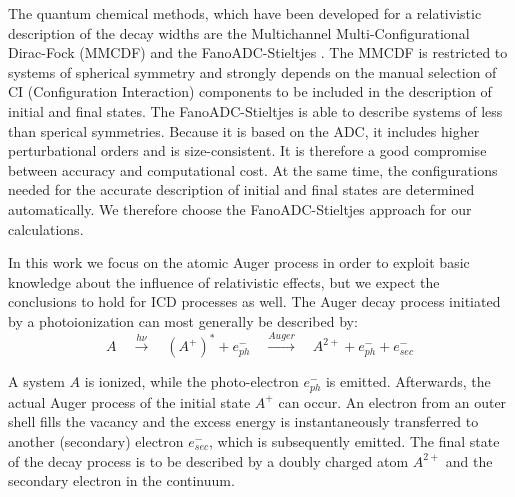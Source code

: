 The quantum chemical methods, which have been developed for a relativistic
description of the decay widths are the Multichannel Multi-Configurational
Dirac-Fock (MMCDF) \cite{Fritzsche11} and the FanoADC-Stieltjes \cite{Fasshauer15_1}.
The MMCDF is restricted to systems of spherical symmetry and strongly depends on
the manual selection of CI (Configuration
Interaction) components to be included in the description of initial and      
final states. The FanoADC-Stieltjes is able to describe systems of less than
sperical symmetries. Because it is based on the ADC, it includes higher perturbational
orders and is size-consistent. It is therefore a good compromise between
accuracy and computational cost. At the same time, the configurations needed for the
accurate description of initial and final states are determined automatically.
We therefore choose the FanoADC-Stieltjes approach for our calculations.


In this work we focus on the atomic Auger process     
in order                                      
to exploit basic knowledge about the influence of relativistic effects,
but we expect the conclusions to hold for ICD processes as well.
The Auger decay process initiated by a photoionization
can most generally be described by:
\begin{equation*}                                               
 A \quad \xrightarrow{h\nu}\quad (A^+)^* + e^-_{ph} \quad       
    \xrightarrow{Auger} \quad A^{2+} + e^-_{ph} + e^-_{sec}     
\end{equation*}                                                 
                                                                
A system $A$ is ionized, while the photo-electron $e^-_{ph}$ is emitted.      
Afterwards, the actual Auger process of the initial state $A^+$ can occur.    
An electron from an outer                                       
shell fills the vacancy and the excess energy is instantaneously transferred  
to another (secondary) electron $e^-_{sec}$, which              
is subsequently emitted. The final state of the decay process   
is to be described by a doubly charged atom $A^{2+}$ and the secondary        
electron in the continuum.

